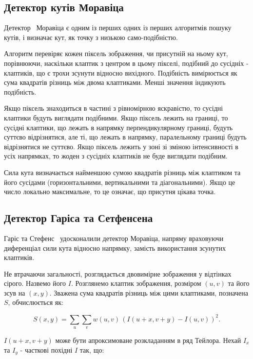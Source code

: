 \subsection{Детектор кутів Моравіца}

Детектор~\cite{Moravec_1981_1849} Моравіца є одним із перших одних із перших алгоритмів пошуку кутів, і визначає кут, як точку з низькою само-подібністю.

Алгоритм перевіряє кожен піксель зображення, чи присутній на ньому кут, порівнюючи, наскільки клаптик з центром в цьому пікселі, подібний до сусідніх - клаптиків, що є трохи зсунути відносно вихідного. Подібність вимірюється як сума квадратів різниць між двома клаптиками. Менші значення індикують подібність.

Якщо піксель знаходиться в частині з рівномірною яскравістю, то сусідні клаптики будуть виглядати подібними. Якщо піксель лежить на границі, то сусідні клаптики, що лежать в напрямку перпендикулярному границі, будуть суттєво відрізнятися, але ті, що лежать в напрямку, паралельному границі будуть відрізнятися не суттєво. Якщо піксель лежить у зоні зі зміною інтенсивності в усіх напрямках, то жоден з сусідніх клаптиків не буде виглядати подібним.

Сила кута визначається найменшою сумою квадратів різниць між клаптиком та його сусідами (горизонтальними, вертикальними та діагональними). Якщо це число локально максимальне, то це означає, що присутня цікава точка.

\subsection{Детектор Гаріса та Сетфенсена}

Гаріс та Стефенс~\cite{Harris88alvey} удосконалили детектор Моравіца, напряму враховуючи диференціал сили кута відносно напрямку, замість використання зсунутих клаптиків. 

Не втрачаючи загальності, розглядається двовимірне зображення у відтінках сірого. Назвемо його $I$. Розглянемо клаптик зображення, розміром $(u,v)$ та його зсув на $(x,y)$. Зважена сума квадратів різниць між цими клаптиками, позначена $S$, обчислюється як:

\begin{equation}
  S(x,y) = \sum_u \sum_v w(u,v) \, \left( I(u+x,v+y) - I(u,v)\right)^2 .
\end{equation}

$I(u + x,v + y)$ може бути апроксимоване розкладанням в ряд Тейлора. Нехай $I_x$ та $I_y$ - часткові похідні $I$ так, що:

